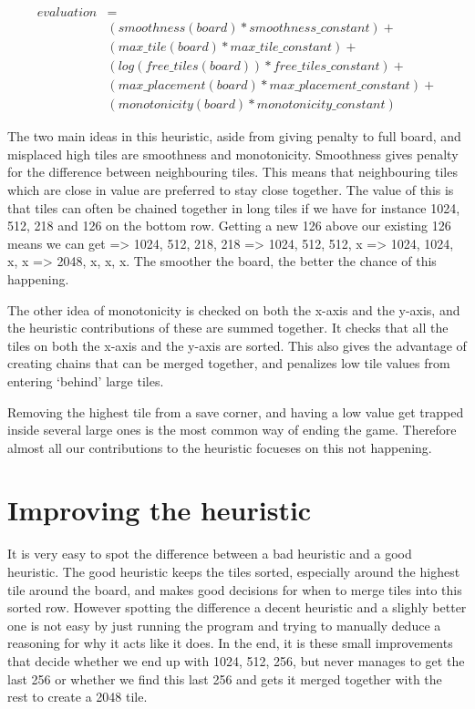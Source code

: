 \begin{equation}
\begin{split}
	evaluation &= \\
        &( smoothness(board) * smoothness\_constant ) + \\
        &( max\_tile(board) * max\_tile\_constant ) + \\
        &( log(free\_tiles(board)) * free\_tiles\_constant ) + \\
        &( max\_placement(board) * max\_placement\_constant ) + \\
        &( monotonicity(board) * monotonicity\_constant )
\end{split}
\end{equation}

The two main ideas in this heuristic, aside from giving penalty to full board, and
misplaced high tiles are smoothness and monotonicity. Smoothness gives penalty
for the difference between neighbouring tiles. This means that neighbouring tiles
which are close in value are preferred to stay close together. The value of this is
that tiles can often be chained together in long tiles if we have for instance
1024, 512, 218 and 126 on the bottom row. Getting a new 126 above our existing 126
means we can get => 1024, 512, 218, 218 => 1024, 512, 512, x => 1024, 1024, x, x =>
2048, x, x, x. The smoother the board, the better the chance of this happening.

The other idea of monotonicity is checked on both the x-axis and the y-axis, and
the heuristic contributions of these are summed together. It checks that all the tiles
on both the x-axis and the y-axis are sorted. This also gives the advantage of
creating chains that can be merged together, and penalizes low tile values from
entering `behind' large tiles.

Removing the highest tile from a save corner, and having a low value get trapped
inside several large ones is the most common way of ending the game. Therefore
almost all our contributions to the heuristic focueses on this not happening.

\section{Improving the heuristic}

It is very easy to spot the difference between a bad heuristic and a good heuristic.
The good heuristic keeps the tiles sorted, especially around the highest tile around
the board, and makes good decisions for when to merge tiles into this sorted row.
However spotting the difference a decent heuristic and a slighly better one is not
easy by just running the program and trying to manually deduce a reasoning for why
it acts like it does. In the end, it is these small improvements that decide whether
we end up with 1024, 512, 256, but never manages to get the last 256 or whether
we find this last 256 and gets it merged together with the rest to create a 2048 tile.

